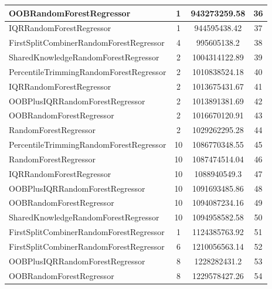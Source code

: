 \begin{table}[h]
\centering
\begin{tabular}{|l|c|c|c|}
\hline
\textcolor[HTML]{b33dc6}{OOBRandomForestRegressor} & 1 & 943273259.58 & 36 \\ \hline
\textcolor[HTML]{27aeef}{IQRRandomForestRegressor} & 1 & 944595438.42 & 37 \\ \hline
\textcolor[HTML]{ea5545}{FirstSplitCombinerRandomForestRegressor} & 4 & 995605138.2 & 38 \\ \hline
\textcolor[HTML]{ef9b20}{SharedKnowledgeRandomForestRegressor} & 2 & 1004314122.89 & 39 \\ \hline
\textcolor[HTML]{f46a9b}{PercentileTrimmingRandomForestRegressor} & 2 & 1010838524.18 & 40 \\ \hline
\textcolor[HTML]{27aeef}{IQRRandomForestRegressor} & 2 & 1013675431.67 & 41 \\ \hline
\textcolor[HTML]{ede15b}{OOBPlusIQRRandomForestRegressor} & 2 & 1013891381.69 & 42 \\ \hline
\textcolor[HTML]{b33dc6}{OOBRandomForestRegressor} & 2 & 1016670120.91 & 43 \\ \hline
\textcolor[HTML]{87bc45}{RandomForestRegressor} & 2 & 1029262295.28 & 44 \\ \hline
\textcolor[HTML]{f46a9b}{PercentileTrimmingRandomForestRegressor} & 10 & 1086770348.55 & 45 \\ \hline
\textcolor[HTML]{87bc45}{RandomForestRegressor} & 10 & 1087474514.04 & 46 \\ \hline
\textcolor[HTML]{27aeef}{IQRRandomForestRegressor} & 10 & 1088940549.3 & 47 \\ \hline
\textcolor[HTML]{ede15b}{OOBPlusIQRRandomForestRegressor} & 10 & 1091693485.86 & 48 \\ \hline
\textcolor[HTML]{b33dc6}{OOBRandomForestRegressor} & 10 & 1094087234.16 & 49 \\ \hline
\textcolor[HTML]{ef9b20}{SharedKnowledgeRandomForestRegressor} & 10 & 1094958582.58 & 50 \\ \hline
\textcolor[HTML]{ea5545}{FirstSplitCombinerRandomForestRegressor} & 1 & 1124385763.92 & 51 \\ \hline
\textcolor[HTML]{ea5545}{FirstSplitCombinerRandomForestRegressor} & 6 & 1210056563.14 & 52 \\ \hline
\textcolor[HTML]{ede15b}{OOBPlusIQRRandomForestRegressor} & 8 & 1228282431.2 & 53 \\ \hline
\textcolor[HTML]{b33dc6}{OOBRandomForestRegressor} & 8 & 1229578427.26 & 54 \\ \hline

\end{tabular}
\end{table}
